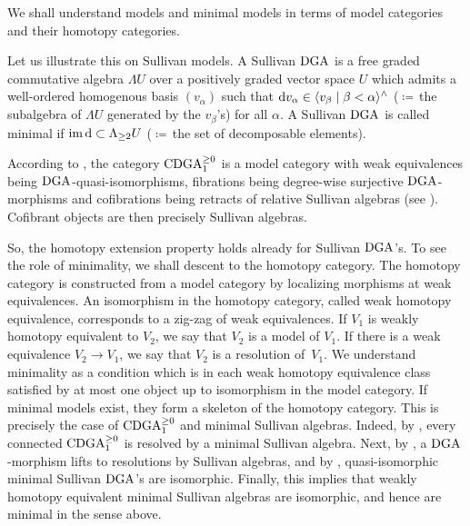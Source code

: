\documentclass[\MainFolder/Text.tex]{subfiles}
\begin{document}
\begin{Remark}\label{Rem:Models}
We shall understand models and minimal models in terms of model categories and their homotopy categories.

Let us illustrate this on Sullivan models. A Sullivan $\mathrm{DGA}$ is a free graded commutative algebra $\Lambda U$ over a positively graded vector space $U$ which admits a well-ordered homogenous basis $(v_\alpha)$ such that $\mathrm{d} v_\alpha \in \langle  v_\beta \mid \beta < \alpha \rangle^\wedge$ ($\coloneqq$\,the subalgebra of $\Lambda U$ generated by the $v_\beta$'s) for all $\alpha$. A Sullivan $\mathrm{DGA}$ is called minimal if $\operatorname{im} \mathrm{d} \subset \Lambda_{\ge 2} U$ ($\coloneqq$\,the set of decomposable elements).

According to \cite{NLabDGAmodel}, the category $\mathrm{CDGA}_{1}^{\ge 0}$ is a model category with weak equivalences being $\mathrm{DGA}$-quasi-isomorphisms, fibrations being degree-wise surjective $\mathrm{DGA}$-morphisms and cofibrations being retracts of relative Sullivan algebras (see \cite[Proposition~2.22 and Proposition~2.28]{Felix2008}). Cofibrant objects are then precisely Sullivan algebras. 

So, the homotopy extension property holds already for Sullivan $\mathrm{DGA}$'s. To see the role of minimality, we shall descent to the homotopy category. The homotopy category is constructed from a model category by localizing morphisms at weak equivalences. An isomorphism in the homotopy category, called weak homotopy equivalence, corresponds to a zig-zag of weak equivalences. If $V_1$ is weakly homotopy equivalent to $V_2$, we say that $V_2$ is a model of $V_1$. If there is a weak equivalence $V_2 \rightarrow V_1$, we say that $V_2$ is a resolution of~$V_1$. We understand minimality as a condition which is in each weak homotopy equivalence class satisfied by at most one object up to isomorphism in the model category. If minimal models exist, they form a skeleton of the homotopy category. This is precisely the case of $\mathrm{CDGA}_{1}^{\ge 0}$ and minimal Sullivan algebras. Indeed, by \cite[Theorem~2.24]{Felix2008}, every connected $\mathrm{CDGA}_{1}^{\ge 0}$ is resolved by a minimal Sullivan algebra. Next, by \cite[Proposition~2.26]{Felix2008}, a $\mathrm{DGA}$-morphism lifts to resolutions by Sullivan algebras, and by \cite[Corollary~2.13]{Felix2008}, quasi-isomorphic minimal Sullivan $\mathrm{DGA}$'s are isomorphic. Finally, this implies that weakly homotopy equivalent minimal Sullivan algebras are isomorphic, and hence are minimal in the sense above.


\end{Remark}
\end{document}
